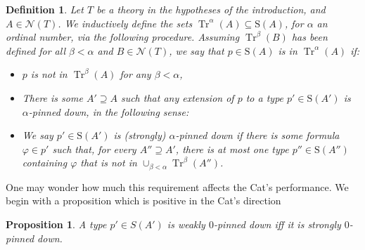 \documentclass{article}
\newtheorem{prop}[theorem]{Proposition}
\newtheorem{definition}[theorem]{Definition}
\theoremstyle{nonumberplain}
\newcommand{\calN}{\mathcal{N}}
\newcommand{\Stone}{\mathrm{S}}
\DeclareMathOperator{\Tr}{Tr}
\begin{document}
\begin{definition}\label{def:tr1}
Let $T$ be a theory in the hypotheses of the introduction, and $A \in \calN(T)$. We inductively define the sets $\Tr^\alpha(A) \subseteq \Stone(A)$, for $\alpha$ an ordinal number, via the following procedure. Assuming $\Tr^\beta(B)$ has been defined for all $\beta < \alpha$ and $B \in \calN(T)$, we say that $p \in \Stone(A)$ is in $\Tr^\alpha(A)$ if:
\begin{itemize}
\item $p$ is not in $\Tr^\beta(A)$ for any $\beta < \alpha$,
\item There is some $A' \supseteq A$ such that any extension of $p$ to a type $p' \in \Stone(A')$ is $\alpha$-pinned down, in the following sense:
\item We say $p' \in \Stone(A')$ is \emph{(strongly) $\alpha$-pinned down} if there is some formula $\varphi \in p'$ such that, for every $A'' \supseteq A'$, there is at most one type $p'' \in \Stone(A'')$ containing $\varphi$ that is not in $\cup_{\beta < \alpha} \Tr^\beta(A'')$.
\end{itemize}
\end{definition}

One may wonder how much this requirement affects the Cat's performance. We begin with a proposition which is positive in the Cat's direction

\begin{prop}
A type $p' \in S(A')$ is weakly $0$-pinned down iff it is strongly $0$-pinned down.
\end{prop}
\end{document}
